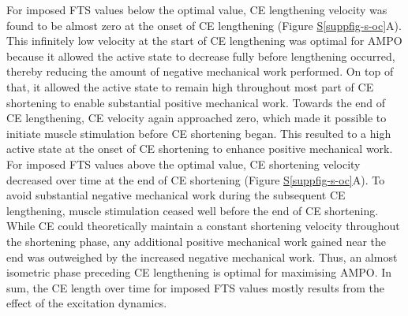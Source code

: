 \documentclass[
  11pt,
  a4paper]{article}
\newcommand*\quartosuppfigref[1]{Figure \hyperref[#1]{S\ref{#1}}}
\begin{document}
For imposed FTS values below the optimal value, CE lengthening velocity
was found to be almost zero at the onset of CE lengthening
(\quartosuppfigref{suppfig-s-oc}A). This infinitely low velocity at the
start of CE lengthening was optimal for AMPO because it allowed the
active state to decrease fully before lengthening occurred, thereby
reducing the amount of negative mechanical work performed. On top of
that, it allowed the active state to remain high throughout most part of
CE shortening to enable substantial positive mechanical work. Towards
the end of CE lengthening, CE velocity again approached zero, which made
it possible to initiate muscle stimulation before CE shortening began.
This resulted to a high active state at the onset of CE shortening to
enhance positive mechanical work. For imposed FTS values above the
optimal value, CE shortening velocity decreased over time at the end of
CE shortening (\quartosuppfigref{suppfig-s-oc}A). To avoid substantial
negative mechanical work during the subsequent CE lengthening, muscle
stimulation ceased well before the end of CE shortening. While CE could
theoretically maintain a constant shortening velocity throughout the
shortening phase, any additional positive mechanical work gained near
the end was outweighed by the increased negative mechanical work. Thus,
an almost isometric phase preceding CE lengthening is optimal for
maximising AMPO. In sum, the CE length over time for imposed FTS values
mostly results from the effect of the excitation dynamics.
\end{document}
